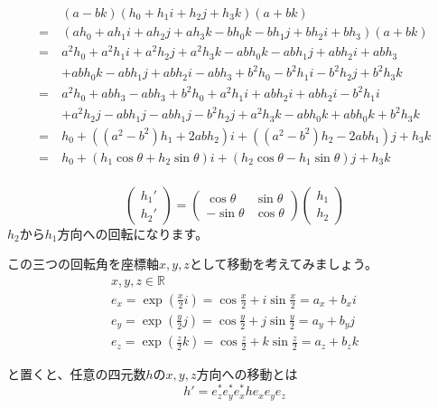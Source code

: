 \documentclass[a4paper,12pt]{jsreport}
\begin{document}
\begin{equation}
\begin{split}
&(a-bk)(h_0+h_1i+h_2j+h_3k)(a+bk)\\
=~&(ah_0+ah_1i+ah_2j+ah_3k-bh_0k-bh_1j+bh_2i+bh_3)(a+bk)\\
=~&a^2h_0+a^2h_1i+a^2h_2j+a^2h_3k-abh_0k-abh_1j+abh_2i+abh_3\\
&+abh_0k-abh_1j+abh_2i-abh_3+b^2h_0-b^2h_1i-b^2h_2j+b^2h_3k\\
=~&a^2h_0+abh_3-abh_3+b^2h_0+a^2h_1i+abh_2i+abh_2i-b^2h_1i\\
&+a^2h_2j-abh_1j-abh_1j-b^2h_2j+a^2h_3k-abh_0k+abh_0k+b^2h_3k\\
=~&h_0+((a^2-b^2)h_1+2abh_2)i+((a^2-b^2)h_2-2abh_1)j+h_3k\\
=~&h_0+(h_1\cos\theta+h_2\sin\theta)i+(h_2\cos\theta-h_1\sin\theta)j+h_3k\\
\end{split}
\end{equation}

\begin{equation}
\begin{pmatrix}h_1'\\h_2'\end{pmatrix}
=\begin{pmatrix}\cos\theta&\sin\theta\\-\sin\theta&\cos\theta\end{pmatrix}
\begin{pmatrix}h_1\\h_2\end{pmatrix}
\end{equation}
$h_2$から$h_1$方向への回転になります。

この三つの回転角を座標軸$x,y,z$として移動を考えてみましょう。
\begin{gather}
x,y,z\in\mathbb{R}\\
e_x=\exp\left(\frac{x}{2}i\right)=\cos\frac{x}{2}+i\sin\frac{x}{2}=a_x+b_xi\\
e_y=\exp\left(\frac{y}{2}j\right)=\cos\frac{y}{2}+j\sin\frac{y}{2}=a_y+b_yj\\
e_z=\exp\left(\frac{z}{2}k\right)=\cos\frac{z}{2}+k\sin\frac{z}{2}=a_z+b_zk
\end{gather}

と置くと、任意の四元数$h$の$x,y,z$方向への移動とは
\begin{equation}
h'=e_z^*e_y^*e_x^*he_xe_ye_z
\end{equation}
\end{document}
